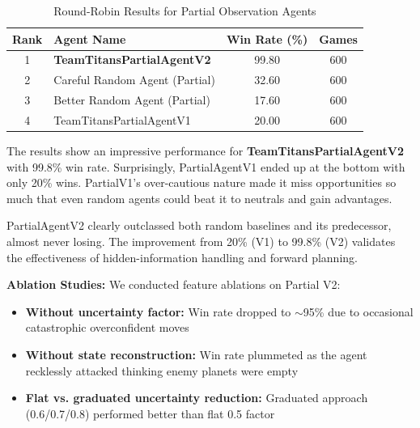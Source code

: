 \documentclass[conference]{IEEEtran}
\begin{document}
\begin{table}[htbp]
\caption{Round-Robin Results for Partial Observation Agents}
\begin{center}
\begin{tabular}{|c|l|c|c|}
\hline
\textbf{Rank} & \textbf{Agent Name} & \textbf{Win Rate (\%)} & \textbf{Games} \\
\hline
1 & \textbf{TeamTitansPartialAgentV2} & 99.80 & 600 \\
2 & Careful Random Agent (Partial) & 32.60 & 600 \\
3 & Better Random Agent (Partial) & 17.60 & 600 \\
4 & TeamTitansPartialAgentV1 & 20.00 & 600 \\
\hline
\end{tabular}
\label{tab:partial_results}
\end{center}
\end{table}

The results show an impressive performance for \textbf{TeamTitansPartialAgentV2} with 99.8\% win rate. Surprisingly, PartialAgentV1 ended up at the bottom with only 20\% wins. PartialV1's over-cautious nature made it miss opportunities so much that even random agents could beat it to neutrals and gain advantages.

PartialAgentV2 clearly outclassed both random baselines and its predecessor, almost never losing. The improvement from 20\% (V1) to 99.8\% (V2) validates the effectiveness of hidden-information handling and forward planning.

\textbf{Ablation Studies:} We conducted feature ablations on Partial V2:
\begin{itemize}
\item \textbf{Without uncertainty factor:} Win rate dropped to $\sim$95\% due to occasional catastrophic overconfident moves
\item \textbf{Without state reconstruction:} Win rate plummeted as the agent recklessly attacked thinking enemy planets were empty
\item \textbf{Flat vs. graduated uncertainty reduction:} Graduated approach (0.6/0.7/0.8) performed better than flat 0.5 factor
\end{itemize}
\end{document}
